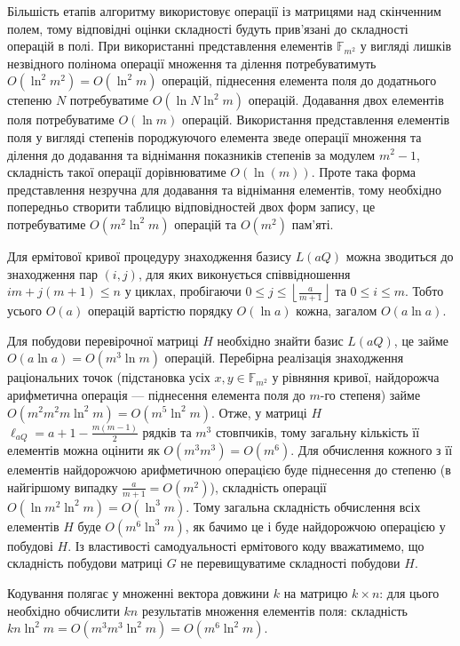\documentclass[a4paper,12pt,oneside]{article}
\begin{document}
Більшість етапів алгоритму використовує операції із матрицями над скінченним полем, тому відповідні оцінки складності будуть прив'язані 
до складності операцій в полі. При використанні представлення елементів $\mathbb{F}_{m^2}$ у вигляді лишків незвідного полінома операції 
множення та ділення потребуватимуть $O(\ln^2 m^2)=O(\ln^2 m)$ операцій, піднесення елемента поля до додатнього степеню $N$ потребуватиме 
$O(\ln N \ln^2 m)$ операцій. Додавання двох елементів поля потребуватиме $O(\ln m)$ операцій. Використання представлення елементів поля у 
вигляді степенів породжуючого елемента зведе операції множення та ділення до додавання та віднімання показників степенів за модулем $m^2-1$, 
складність такої операції дорівнюватиме $O(\ln(m))$. Проте така форма представлення незручна для додавання та віднімання елементів, тому 
необхідно попередньо створити таблицю відповідностей двох форм запису, це потребуватиме $O(m^2 \ln^2 m)$ операцій та $O(m^2)$ пам'яті.

Для ермітової кривої процедуру знаходження базису $L(aQ)$ можна зводиться до знаходження пар $(i, j)$, для яких виконується співвідношення 
$i m + j (m + 1) \le n$ у циклах, пробігаючи $0 \le j \le \left \lfloor \frac{a}{m+1} \right \rfloor$ та $0 \le i \le m$. Тобто усього $O(a)$ операцій 
вартістю порядку $O(\ln a)$ кожна, загалом $O(a \ln a)$.

Для побудови перевірочної матриці $H$ необхідно знайти базис $L(aQ)$, це займе $O(a \ln a) = O(m^3 \ln m)$ операцій. 
Перебірна реалізація знаходження раціональних точок (підстановка усіх $x, y \in \mathbb{F}_{m^2}$ у рівняння кривої, найдорожча арифметична операція --- 
піднесення елемента поля до $m$-го степеня) займе $O(m^2 m^2 m \ln^2 m) = O(m^5 \ln^2 m)$. Отже, у матриці $H$ $\ell_{aQ}=a+1-\frac{m(m-1)}{2}$ рядків та 
$m^3$ стовпчиків, тому загальну кількість її елементів можна оцінити як $O(m^3 m^3) = O(m^6)$. Для обчислення кожного з її елементів найдорожчою 
арифметичною операцією буде піднесення до степеню (в найгіршому випадку $\frac{a}{m+1}=O(m^2)$), складність операції $O(\ln m^2 \ln^2 m) = O(\ln^3 m)$. 
Тому загальна складність обчислення всіх елементів $H$ буде $O(m^6 \ln^3 m)$, як бачимо це і буде найдорожчою операцією у побудові $H$. Із 
властивості самодуальності ермітового коду вважатимемо, що складність побудови матриці $G$ не перевищуватиме складності побудови $H$.

Кодування полягає у множенні вектора довжини $k$ на матрицю $k \times n$: для цього необхідно обчислити $k n$ результатів множення елементів поля: 
складність $k n \ln^2 m = O(m^3 m^3 \ln^2 m) = O(m^6 \ln^2 m)$.
\end{document}
